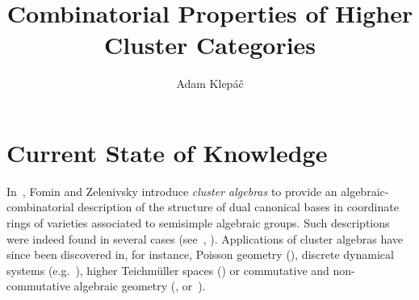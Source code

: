 \documentclass[a4paper,oneside,svgnames]{amsart}
\title{Combinatorial Properties of Higher Cluster Categories}
\author{Adam Klepáč}
\theoremstyle{plain}
\theoremstyle{definition}
\begin{document}
 \maketitle
 \section*{Current State of Knowledge}

 In~\cite{fz1}, Fomin and Zelenivsky introduce \emph{cluster algebras} to
 provide an algebraic-combinatorial description of the structure of dual
 canonical bases in coordinate rings of varieties associated to semisimple
 algebraic groups. Such descriptions were indeed found in several cases
 (see~\cite{fzb}, \cite{s}). Applications of cluster algebras have since been
 discovered in, for instance, Poisson geometry (\cite{gsv}), discrete dynamical
 systems (e.g.~\cite{fz3}), higher Teichmüller spaces (\cite{fg}) or commutative
 and non-commutative algebraic geometry (\cite{ifz}, \cite{ks} or~\cite{gmn}).
\end{document}
